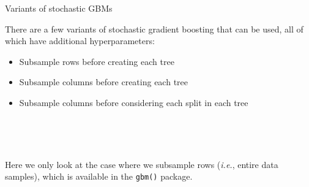 \documentclass[
  10pt,
  ignorenonframetext,
]{beamer}
\providecommand{\tightlist}{%
  \setlength{\itemsep}{0pt}\setlength{\parskip}{0pt}}
\begin{document}
\begin{frame}[fragile]
\begin{block}{Variants of stochastic GBMs}
\label{variants-of-stochastic-gbms}
\(~\)

There are a few variants of stochastic gradient boosting that can be
used, all of which have additional hyperparameters:

\vspace{2mm}

\begin{itemize}
\tightlist
\item
  Subsample rows before creating each tree
\end{itemize}

\vspace{2mm}

\begin{itemize}
\tightlist
\item
  Subsample columns before creating each tree
\end{itemize}

\vspace{2mm}

\begin{itemize}
\tightlist
\item
  Subsample columns before considering each split in each tree
\end{itemize}

\(~\)

\(~\)

Here we only look at the case where we subsample rows (\emph{i.e.},
entire data samples), which is available in the \texttt{gbm()} package.
\end{block}
\end{frame}
\end{document}
